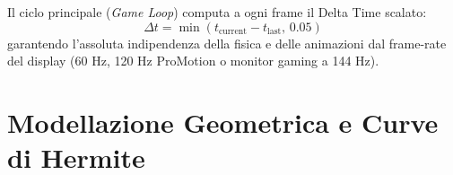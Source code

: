 \documentclass[11pt,a4paper]{article}
\begin{document}
\noindent Il ciclo principale (\textit{Game Loop}) computa a ogni frame il Delta Time scalato:
\begin{equation}
\Delta t = \min\left(t_{\text{current}} - t_{\text{last}},\, 0.05\right)
\end{equation}
garantendo l'assoluta indipendenza della fisica e delle animazioni dal frame-rate del display (60 Hz, 120 Hz ProMotion o monitor gaming a 144 Hz).

\section{Modellazione Geometrica e Curve di Hermite}
\end{document}

